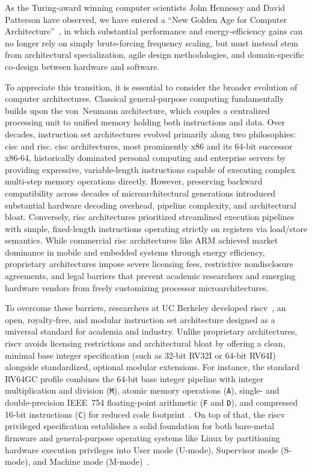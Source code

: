 As the Turing-award winning computer scientists John Hennessy and David Patterson have observed, we have entered a ``New Golden Age for Computer Architecture''~\cite{hennessy2019new},
in which substantial performance and energy-efficiency gains can no longer rely on simply brute-forcing frequency scaling,
but must instead stem from architectural specialization, agile design methodologies, and domain-specific co-design between hardware and software.

To appreciate this transition, it is essential to consider the broader evolution of computer architectures.
Classical general-purpose computing fundamentally builds upon the von~Neumann architecture, which couples a centralized processing unit to unified memory holding both instructions and data.
Over decades, instruction set architectures evolved primarily along two philosophies: \gls{cisc} and \gls{risc}.
\gls{cisc} architectures, most prominently x86 and its 64-bit successor x86-64, historically dominated personal computing and enterprise servers by providing expressive, variable-length instructions capable of executing complex multi-step memory operations directly.
However, preserving backward compatibility across decades of microarchitectural generations introduced substantial hardware decoding overhead, pipeline complexity, and architectural bloat.
Conversely, \gls{risc} architectures prioritized streamlined execution pipelines with simple, fixed-length instructions operating strictly on registers via load/store semantics.
While commercial \gls{risc} architectures like ARM achieved market dominance in mobile and embedded systems through energy efficiency, proprietary architectures impose severe licensing fees, restrictive nondisclosure agreements, and legal barriers that prevent academic researchers and emerging hardware vendors from freely customizing processor microarchitectures.

To overcome these barriers, researchers at UC Berkeley developed \gls{riscv}~\cite{patterson2014case,waterman2019user}, an open, royalty-free, and modular instruction set architecture designed as a universal standard for academia and industry.
Unlike proprietary architectures, \gls{riscv} avoids licensing restrictions and architectural bloat by offering a clean, minimal base integer specification (such as 32-bit RV32I or 64-bit RV64I) alongside standardized, optional modular extensions.
For instance, the standard RV64GC profile combines the 64-bit base integer pipeline with integer multiplication and division (\texttt{M}), atomic memory operations (\texttt{A}), single- and double-precision IEEE~754 floating-point arithmetic (\texttt{F} and \texttt{D}), and compressed 16-bit instructions (\texttt{C}) for reduced code footprint~\cite{waterman2019user}.
On top of that, the \gls{riscv} privileged specification establishes a solid foundation for both bare-metal firmware and general-purpose operating systems like Linux by partitioning hardware execution privileges into User mode (U-mode), Supervisor mode (S-mode), and Machine mode (M-mode)~\cite{waterman2019riscv}.

